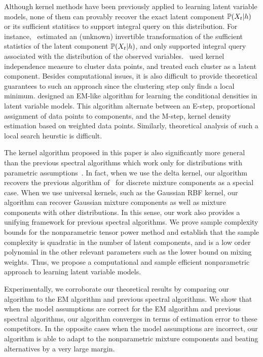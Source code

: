 \documentclass{article}
\begin{document}
Although kernel methods have been previously applied to learning latent variable models, none of them can provably recover the exact latent component $\mathbb{P}(X_t|h)$ or its sufficient statitiscs to support integral query on this distribution. For instance, \citet{SonParXin11, SonDai13}~estimated an (unknown) invertible transformation of the sufficient statistics of the latent component $\mathbb{P}(X_t|h)$, and only supported integral query associated with the distribution of the observed variables. \citet{SgoJanPetSch13}~used kernel independence measure to cluster data points, and treated each cluster as a latent component. Besides computational issues, it is also difficult to provide theoretical guarantees to such an approach since the clustering step only finds a local minimum. \citet{BenChaHun09} designed an EM-like algorithm for 
learning the conditional densities in latent variable models. This algorithm alternate between an E-step, proportional assignment of data points to components, and the M-step, kernel density estimation based on weighted data points. Similarly, theoretical analysis of such a local search heurstic is difficult.

The kernel algorithm proposed in this paper is also significantly more general than the previous spectral algorithms which work only for distributions with parametric assumptions~\cite{AnandkumarEtal:tensor12,HsuKak13}. In fact, when we use the delta kernel, our algorithm recovers the previous algorithm of~\citet{AnandkumarEtal:tensor12} for discrete mixture components as a special case. When we use universal kernels, such as the Gaussian RBF kernel, our algorithm can recover Gaussian mixture components as well as mixture components with other distributions. In this sense, our work also provides a unifying framework for previous spectral algorithms. We prove sample complexity bounds for the nonparametric tensor power method and establish  that the sample complexity is quadratic in the number of latent components, and is a low order polynomial in the other relevant parameters such as the lower bound on mixing weights. Thus, we propose a computational and sample efficient nonparametric approach to learning 
latent variable models.

Experimentally, we corroborate our theoretical results by comparing our algorithm to the EM algorithm and previous spectral algorithms. We show that when the model assumptions are correct for the EM algorithm and previous spectral algorithms, our algorithm converges in terms of estimation error to these competitors. In the opposite cases when the model assumptions are incorrect, our algorithm is able to adapt to the nonparametric mixture components and beating alternatives by a very large margin.
\end{document}

